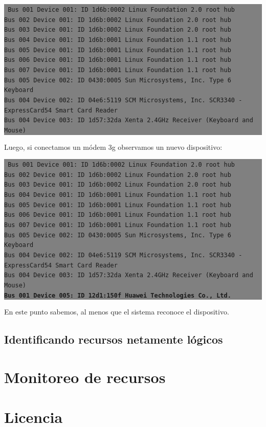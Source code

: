 \documentclass[12pt]{article}
\begin{document}
\colorbox{grey}{\parbox[t]{0.95\linewidth}{ \vspace*{0.5cm} { 
{\tt
Bus 001 Device 001: ID 1d6b:0002 Linux Foundation 2.0 root hub\\
Bus 002 Device 001: ID 1d6b:0002 Linux Foundation 2.0 root hub\\
Bus 003 Device 001: ID 1d6b:0002 Linux Foundation 2.0 root hub\\
Bus 004 Device 001: ID 1d6b:0001 Linux Foundation 1.1 root hub\\
Bus 005 Device 001: ID 1d6b:0001 Linux Foundation 1.1 root hub\\
Bus 006 Device 001: ID 1d6b:0001 Linux Foundation 1.1 root hub\\
Bus 007 Device 001: ID 1d6b:0001 Linux Foundation 1.1 root hub\\
Bus 005 Device 002: ID 0430:0005 Sun Microsystems, Inc. Type 6 Keyboard\\
Bus 004 Device 002: ID 04e6:5119 SCM Microsystems, Inc. SCR3340 - ExpressCard54 Smart Card Reader\\
Bus 004 Device 003: ID 1d57:32da Xenta 2.4GHz Receiver (Keyboard and Mouse)
}
} \vspace*{0.5cm} } } 

Luego, si conectamos un módem 3g observamos un nuevo dispositivo: 

\colorbox{grey}{\parbox[t]{0.95\linewidth}{ \vspace*{0.5cm} { 
{\tt
Bus 001 Device 001: ID 1d6b:0002 Linux Foundation 2.0 root hub\\
Bus 002 Device 001: ID 1d6b:0002 Linux Foundation 2.0 root hub\\
Bus 003 Device 001: ID 1d6b:0002 Linux Foundation 2.0 root hub\\
Bus 004 Device 001: ID 1d6b:0001 Linux Foundation 1.1 root hub\\
Bus 005 Device 001: ID 1d6b:0001 Linux Foundation 1.1 root hub\\
Bus 006 Device 001: ID 1d6b:0001 Linux Foundation 1.1 root hub\\
Bus 007 Device 001: ID 1d6b:0001 Linux Foundation 1.1 root hub\\
Bus 005 Device 002: ID 0430:0005 Sun Microsystems, Inc. Type 6 Keyboard\\
Bus 004 Device 002: ID 04e6:5119 SCM Microsystems, Inc. SCR3340 - ExpressCard54 Smart Card Reader\\
Bus 004 Device 003: ID 1d57:32da Xenta 2.4GHz Receiver (Keyboard and Mouse)\\
\textbf{Bus 001 Device 005: ID 12d1:150f Huawei Technologies Co., Ltd.}
}
} \vspace*{0.5cm} } } 

En este punto sabemos, al menos que el sistema reconoce el dispositivo. 




\subsection*{Identificando recursos netamente lógicos}

\section*{Monitoreo de recursos}


\section*{Licencia}
\end{document}
